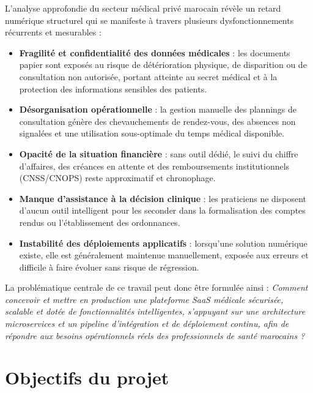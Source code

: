 L'analyse approfondie du secteur médical privé marocain révèle un retard numérique
structurel qui se manifeste à travers plusieurs dysfonctionnements récurrents et
mesurables :

\begin{itemize}
  \item \textbf{Fragilité et confidentialité des données médicales} : les documents
    papier sont exposés au risque de détérioration physique, de disparition ou de
    consultation non autorisée, portant atteinte au secret médical et à la protection
    des informations sensibles des patients.

  \item \textbf{Désorganisation opérationnelle} : la gestion manuelle des plannings
    de consultation génère des chevauchements de rendez-vous, des absences non
    signalées et une utilisation sous-optimale du temps médical disponible.

  \item \textbf{Opacité de la situation financière} : sans outil dédié, le suivi
    du chiffre d'affaires, des créances en attente et des remboursements institutionnels
    (CNSS/CNOPS) reste approximatif et chronophage.

  \item \textbf{Manque d'assistance à la décision clinique} : les praticiens ne
    disposent d'aucun outil intelligent pour les seconder dans la formalisation
    des comptes rendus ou l'établissement des ordonnances.

  \item \textbf{Instabilité des déploiements applicatifs} : lorsqu'une solution
    numérique existe, elle est généralement maintenue manuellement, exposée aux
    erreurs et difficile à faire évoluer sans risque de régression.
\end{itemize}

La problématique centrale de ce travail peut donc être formulée ainsi :
\textit{Comment concevoir et mettre en production une plateforme SaaS médicale
sécurisée, scalable et dotée de fonctionnalités intelligentes, s'appuyant sur
une architecture microservices et un pipeline d'intégration et de déploiement
continu, afin de répondre aux besoins opérationnels réels des professionnels
de santé marocains ?}

\section{Objectifs du projet}

